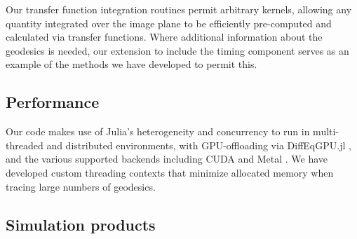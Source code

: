 Our transfer function integration routines permit arbitrary kernels, allowing any quantity integrated over the image plane to be efficiently pre-computed and calculated via transfer functions. Where additional information about the geodesics is needed, our extension to include the timing component serves as an example of the methods we have developed to permit this.

\subsection{Performance}
\label{sec:performance}

Our code makes use of Julia's heterogeneity and concurrency to run in multi-threaded and distributed environments, with GPU-offloading via DiffEqGPU.jl \citep{utkarsh2023automated}, and the various supported backends including CUDA and Metal \citep{besard2018juliagpu}. We have developed custom threading contexts that minimize allocated memory when tracing large numbers of geodesics.




\subsection{Simulation products}


